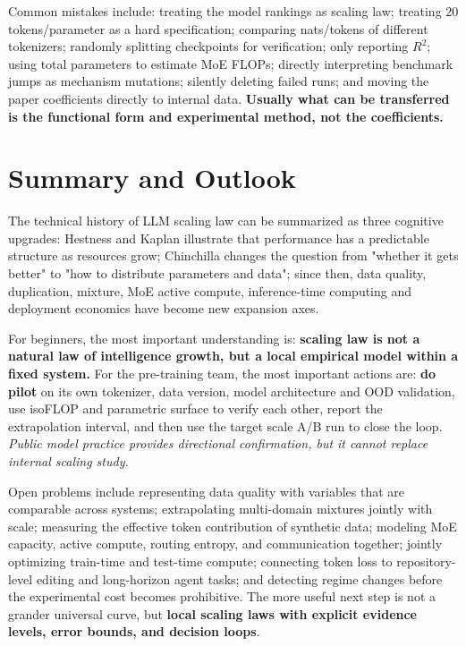 \documentclass[UTF8,10pt,a4paper,fontset=none]{ctexart}
\newcommand{\term}[1]{\textbf{#1}}
\begin{document}
Common mistakes include: treating the model rankings as scaling law; treating 20 tokens/parameter as a hard specification; comparing nats/tokens of different tokenizers; randomly splitting checkpoints for verification; only reporting $R^2$; using total parameters to estimate MoE FLOPs; directly interpreting benchmark jumps as mechanism mutations; silently deleting failed runs; and moving the paper coefficients directly to internal data. \textbf{ Usually what can be transferred is the functional form and experimental method, not the coefficients. }

\section{Summary and Outlook}

The technical history of LLM scaling law can be summarized as three cognitive upgrades: Hestness and Kaplan illustrate that performance has a predictable structure as resources grow; Chinchilla changes the question from "whether it gets better" to "how to distribute parameters and data"; since then, data quality, duplication, mixture, MoE active compute, inference-time computing and deployment economics have become new expansion axes.

For beginners, the most important understanding is: \textbf{scaling law is not a natural law of intelligence growth, but a local empirical model within a fixed system. } For the pre-training team, the most important actions are: \textbf{ do pilot} on its own tokenizer, data version, model architecture and OOD validation, use isoFLOP and parametric surface to verify each other, report the extrapolation interval, and then use the target scale A/B run to close the loop. \textit{ Public model practice provides directional confirmation, but it cannot replace internal scaling study. }

Open problems include representing data quality with variables that are comparable across systems; extrapolating multi-domain mixtures jointly with scale; measuring the effective token contribution of synthetic data; modeling MoE capacity, active compute, routing entropy, and communication together; jointly optimizing train-time and test-time compute; connecting token loss to repository-level editing and long-horizon agent tasks; and detecting regime changes before the experimental cost becomes prohibitive. The more useful next step is not a grander universal curve, but \term{local scaling laws with explicit evidence levels, error bounds, and decision loops}.
\end{document}
